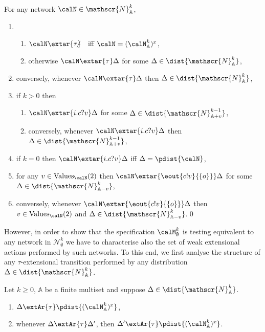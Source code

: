 \documentclass{LMCS}
\begin{document}
\begin{prop}
\label{prop:routing.impl.strong}
For any network $\calN \in \mathscr{N}^k_{\mathbb{A}}$, 
\begin{enumerate} 
\item 
\begin{enumerate}[label=(\roman*)]
\item $\calN \extar{\tau}\hspace{-10pt}\not\;\hspace{10pt}$ 
iff $\calN = (\calN^{k}_{\mathbb{A}})^{x}$, 
\item otherwise $\calN \extar{\tau} \Delta$ for some 
$\Delta \in \dist{\mathscr{N}^k_{\mathbb{A}}}$, 
\end{enumerate}
\item conversely, whenever $\calN \extar{\tau} \Delta$ 
then $\Delta \in \dist{\mathscr{N}^{k}_{\mathbb{A}}}$,
\item if $k > 0$ then 
\begin{enumerate}[label=(\roman*)]
\item $\calN \extar{i.c?v} \Delta$ 
for some $\Delta \in \dist{\mathscr{N}^{k-1}_{\mathbb{A} + v}}$, 
\item conversely, whenever $\calN \extar{i.c?v} \Delta$ then 
$\Delta \in \dist{\mathscr{N}^{k-1}_{\mathbb{A} + v}}$, 
\end{enumerate}
\item if $k = 0$ then $\calN \extar{i.c?v} \Delta$ iff 
$\Delta = \pdist{\calN}$,
\item for any $v \in \mbox{Values}_{\calN}(2)$ then 
$\calN \extar{\eout{c!v}{\{o\}}} \Delta$ for some 
$\Delta \in \dist{\mathscr{N}^k_{\mathbb{A} - v}}$,
\item conversely, whenever $\calN \extar{\eout{c!v}{\{o\}}} 
\Delta$ then $v \in \mbox{Values}_{\calN}(2)$ and 
$\Delta \in \dist{\mathscr{N}^k_{\mathbb{A} - v}}$.\qed
\end{enumerate}
\end{prop}

However, in order to show that the specification 
$\calM^k_{\emptyset}$ is testing equivalent to any network 
in $\mathscr{N}^k_{\emptyset}$ we have to characterise 
also the set of weak extensional actions performed 
by such networks. To this end, we first analyse 
the structure of any $\tau$-extensional transition performed 
by any distribution $\Delta \in \dist{\mathscr{N}^k_{\mathbb{A}}}$. 

\begin{prop}
\label{prop:stop.reachable}
Let $k \geq 0$, $\mathbb{A}$ be a finite multiset and 
suppose $\Delta \in \dist{\mathscr{N}^k_{\mathbb{A}}}$. 
\begin{enumerate}
\item $\Delta \extAr{\tau} \pdist{(\calN^k_{\mathbb{A}})^{x}}$,
\item whenever $\Delta \extAr{\tau} \Delta'$, then 
$\Delta' \extAr{\tau} \pdist{(\calN^k_{\mathbb{A}})^x}$.
\end{enumerate}
\end{prop}
\end{document}
